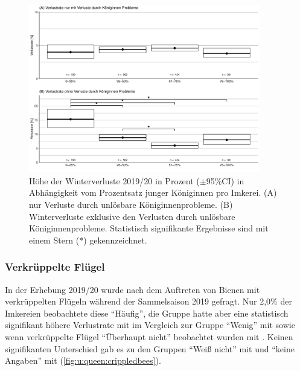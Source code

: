 \begin{figure}[H]
  \centering
  \includegraphics[keepaspectratio,width=0.9\textwidth]{project-U-wintersterblichkeit/figures/plot_queen_exchangerate}
  \caption{Höhe der Winterverluste 2019/20 in Prozent ($\pm$95\%CI) in Abhängigkeit vom Prozentsatz junger Königinnen pro Imkerei. (A) nur Verluste durch unlösbare Königinnenprobleme. (B) Winterverluste exklusive den Verlusten durch unlösbare Königinnenprobleme. Statistisch signifikante Ergebnisse sind mit einem Stern (*) gekennzeichnet.}
  \label{fig:u:queen:exchangerate}
\end{figure}

\subsubsection{Verkrüppelte Flügel}
\label{ss:verkeuppelte_fluegel:U}

In der Erhebung 2019/20 wurde nach dem Auftreten von Bienen mit verkrüppelten Flügeln während der Sammelsaison 2019 gefragt. Nur 2,0\% der Imkereien beobachtete diese \enquote{Häufig}, die Gruppe hatte aber eine statistisch signifikant höhere Verlustrate mit  im Vergleich zur Gruppe \enquote{Wenig} mit  sowie wenn verkrüppelte Flügel \enquote{Überhaupt nicht} beobachtet wurden mit . Keinen signifikanten Unterschied gab es zu den Gruppen \enquote{Weiß nicht} mit  und \enquote{keine Angaben} mit  (\cref{fig:u:queen:crippledbees}).

